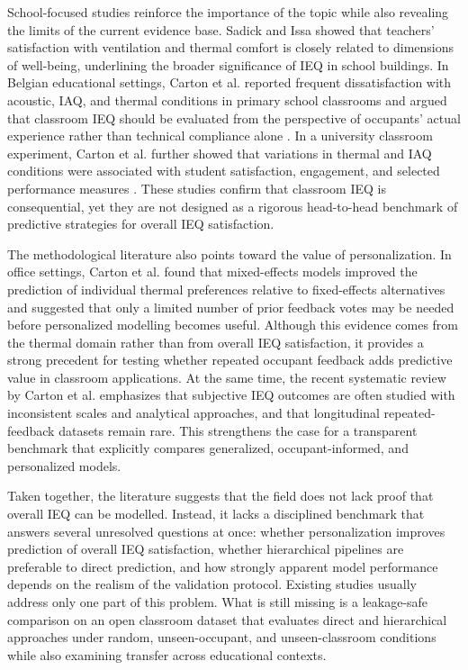 \documentclass[11pt]{article}
\begin{document}
School-focused studies reinforce the importance of the topic while also revealing the limits of the current evidence base. Sadick and Issa \cite{sadick2017} showed that teachers' satisfaction with ventilation and thermal comfort is closely related to dimensions of well-being, underlining the broader significance of IEQ in school buildings. In Belgian educational settings, Carton et al. reported frequent dissatisfaction with acoustic, IAQ, and thermal conditions in primary school classrooms and argued that classroom IEQ should be evaluated from the perspective of occupants' actual experience rather than technical compliance alone \cite{carton2023primary}. In a university classroom experiment, Carton et al. further showed that variations in thermal and IAQ conditions were associated with student satisfaction, engagement, and selected performance measures \cite{carton2023iaqvec}. These studies confirm that classroom IEQ is consequential, yet they are not designed as a rigorous head-to-head benchmark of predictive strategies for overall IEQ satisfaction.

The methodological literature also points toward the value of personalization. In office settings, Carton et al. \cite{carton2024mixed} found that mixed-effects models improved the prediction of individual thermal preferences relative to fixed-effects alternatives and suggested that only a limited number of prior feedback votes may be needed before personalized modelling becomes useful. Although this evidence comes from the thermal domain rather than from overall IEQ satisfaction, it provides a strong precedent for testing whether repeated occupant feedback adds predictive value in classroom applications. At the same time, the recent systematic review by Carton et al. \cite{carton2026review} emphasizes that subjective IEQ outcomes are often studied with inconsistent scales and analytical approaches, and that longitudinal repeated-feedback datasets remain rare. This strengthens the case for a transparent benchmark that explicitly compares generalized, occupant-informed, and personalized models.

Taken together, the literature suggests that the field does not lack proof that overall IEQ can be modelled. Instead, it lacks a disciplined benchmark that answers several unresolved questions at once: whether personalization improves prediction of overall IEQ satisfaction, whether hierarchical pipelines are preferable to direct prediction, and how strongly apparent model performance depends on the realism of the validation protocol. Existing studies usually address only one part of this problem. What is still missing is a leakage-safe comparison on an open classroom dataset that evaluates direct and hierarchical approaches under random, unseen-occupant, and unseen-classroom conditions while also examining transfer across educational contexts.
\end{document}
